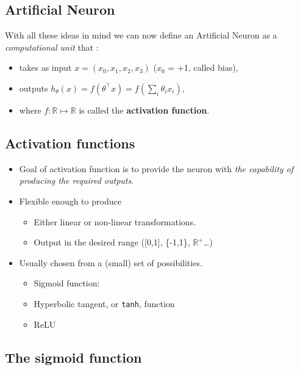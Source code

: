 \documentclass[
  letterpaper,
  DIV=11,
  numbers=noendperiod]{scrartcl}
\providecommand{\tightlist}{%
  \setlength{\itemsep}{0pt}\setlength{\parskip}{0pt}}\usepackage{longtable,booktabs,array}
\begin{document}
\hypertarget{artificial-neuron}{%
\subsection{Artificial Neuron}\label{artificial-neuron}}

With all these ideas in mind we can now define an Artificial Neuron as a
\emph{computational unit} that :

\begin{itemize}
\item
  takes as input \(x=(x_0,x_1,x_2,x_3)\) (\(x_0\) = +1, called bias),
\item
  outputs
  \(h_{\theta}(x) = f(\theta^\intercal x) = f(\sum_i \theta_ix_i)\),
\item
  where \(f:\mathbb{R}\mapsto \mathbb{R}\) is called the
  \textbf{activation function}.
\end{itemize}

\hypertarget{activation-functions}{%
\subsection{Activation functions}\label{activation-functions}}

\begin{itemize}
\item
  Goal of activation function is to provide the neuron with \emph{the
  capability of producing the required outputs}.
\item
  Flexible enough to produce

  \begin{itemize}
  \tightlist
  \item
    Either linear or non-linear transformations.
  \item
    Output in the desired range ({[}0,1{]}, \{-1,1\},
    \(\mathbb{R}^+\)\ldots)
  \end{itemize}
\item
  Usually chosen from a (small) set of possibilities.

  \begin{itemize}
  \tightlist
  \item
    Sigmoid function:
  \item
    Hyperbolic tangent, or \texttt{tanh}, function
  \item
    ReLU
  \end{itemize}
\end{itemize}

\hypertarget{the-sigmoid-function}{%
\subsection{The sigmoid function}\label{the-sigmoid-function}}
\end{document}
